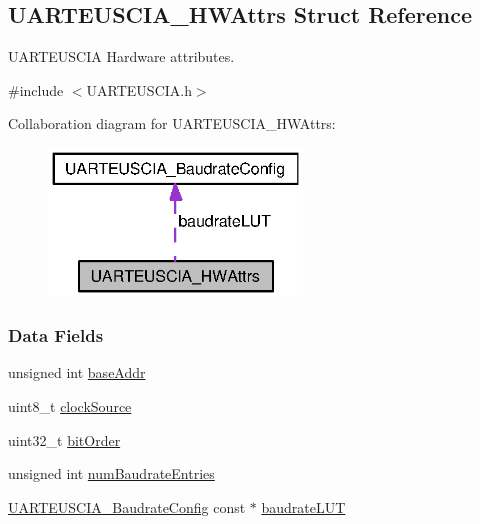\subsection{U\+A\+R\+T\+E\+U\+S\+C\+I\+A\+\_\+\+H\+W\+Attrs Struct Reference}
\label{struct_u_a_r_t_e_u_s_c_i_a___h_w_attrs}


U\+A\+R\+T\+E\+U\+S\+C\+I\+A Hardware attributes.  




{\ttfamily \#include $<$U\+A\+R\+T\+E\+U\+S\+C\+I\+A.\+h$>$}



Collaboration diagram for U\+A\+R\+T\+E\+U\+S\+C\+I\+A\+\_\+\+H\+W\+Attrs\+:
\nopagebreak
\begin{figure}[H]
\begin{center}
\leavevmode
\includegraphics[width=191pt]{struct_u_a_r_t_e_u_s_c_i_a___h_w_attrs__coll__graph}
\end{center}
\end{figure}
\subsubsection*{Data Fields}
\begin{DoxyCompactItemize}
\item 
unsigned int \hyperlink{struct_u_a_r_t_e_u_s_c_i_a___h_w_attrs_afa40bb7e1a85f9e20565a690ed9b86cc}{base\+Addr}
\item 
uint8\+\_\+t \hyperlink{struct_u_a_r_t_e_u_s_c_i_a___h_w_attrs_a159323cc716d9d4fc0f5ece693f3d528}{clock\+Source}
\item 
uint32\+\_\+t \hyperlink{struct_u_a_r_t_e_u_s_c_i_a___h_w_attrs_a48aec31e8f3fb52f3474a00ba00b485b}{bit\+Order}
\item 
unsigned int \hyperlink{struct_u_a_r_t_e_u_s_c_i_a___h_w_attrs_aba3f3da62966d8a0ea9956dafa74aea5}{num\+Baudrate\+Entries}
\item 
\hyperlink{struct_u_a_r_t_e_u_s_c_i_a___baudrate_config}{U\+A\+R\+T\+E\+U\+S\+C\+I\+A\+\_\+\+Baudrate\+Config} const $\ast$ \hyperlink{struct_u_a_r_t_e_u_s_c_i_a___h_w_attrs_a38c226d296905607c444d1d7ec2e04fe}{baudrate\+L\+U\+T}
\end{DoxyCompactItemize}


